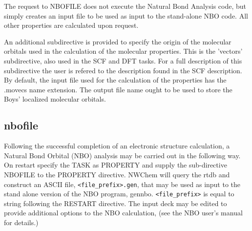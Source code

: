 The request to NBOFILE does not execute the Natural Bond Analysis
code, but simply creates an input file to be used as input to the
stand-alone NBO code. All other properties are calculated upon
request.

An additional subdirective is provided to specify the origin of the
molecular orbitals used in the calculation of the molecular
properties. This is the 'vectors' subdirective, also used in the
SCF and DFT tasks. For a full description of this subdirective
the user is refered to the description found in the SCF description.
By default, the input file used for the calculation of the properties
has the .movecs name extension. The output file name ought to be
used to store the Boys' localized molecular orbitals.

\subsection{nbofile}

Following the successful completion of an electronic structure
calculation, a Natural Bond Orbital (NBO) analysis may be carried out
in the following way.  On restart specify the TASK as PROPERTY and
supply the sub-directive NBOFILE to the PROPERTY directive.  NWChem
will query the rtdb and construct an ASCII file,
\verb+<file_prefix>.gen+, that may be used as input to the stand alone
version of the NBO program, gennbo.  \verb+<file_prefix>+ is equal to
string following the RESTART directive.  The input deck may be edited
to provide additional options to the NBO calculation, (see the NBO
user's manual for details.)

